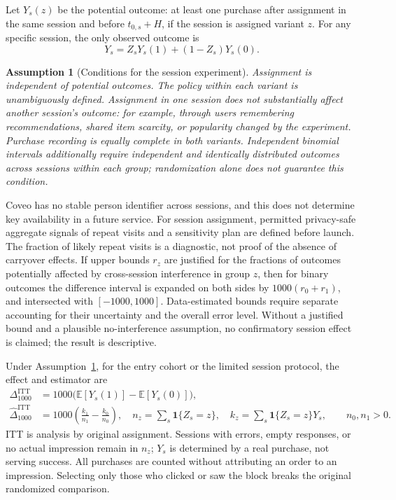 \documentclass[12pt,a4paper]{article}
\newcommand{\E}{\mathbb E}
\newcommand{\ind}{\mathbf 1}
\theoremstyle{plainru}
\newtheorem{assumption}{Assumption}[section]
\begin{document}
Let $Y_s(z)$ be the potential outcome: at least one purchase
after assignment in the same session and before $t_{0,s}+H$, if the session is assigned
variant $z$. For any specific session, the only observed outcome is
\begin{equation}\label{eq:eval-observed-outcome}
 Y_s=Z_sY_s(1)+(1-Z_s)Y_s(0).
\end{equation}
\begin{assumption}[Conditions for the session experiment]
\label{ass:eval-randomization}
Assignment is independent of potential outcomes.
The policy within each variant is unambiguously defined.
Assignment in one session does not substantially affect another session's outcome:
for example, through users remembering recommendations, shared item
scarcity, or popularity changed by the experiment.
Purchase recording is equally complete in both variants.
Independent binomial intervals additionally require
independent and identically distributed outcomes across sessions within
each group; randomization alone does not guarantee this condition.
\end{assumption}

Coveo has no stable person identifier across sessions, and
this does not determine key availability in a future service. For session
assignment, permitted privacy-safe aggregate signals of repeat visits
and a sensitivity plan are defined before launch. The fraction of likely
repeat visits is a diagnostic, not proof of the absence of carryover effects.
If upper bounds $r_z$ are justified for the fractions of outcomes potentially
affected by cross-session interference in group $z$, then for binary outcomes
the difference interval is expanded on both sides by $1000(r_0+r_1)$,
and intersected with $[-1000,1000]$. Data-estimated bounds require separate
accounting for their uncertainty and the overall error level. Without
a justified bound and a plausible no-interference assumption,
no confirmatory session effect is claimed; the result is descriptive.

Under Assumption~\ref{ass:eval-randomization}, for the entry
cohort or the limited session protocol, the effect and estimator are
\begin{align}
 \Delta_{1000}^{\mathrm{ITT}}
 &=1000\bigl(\E[Y_s(1)]-\E[Y_s(0)]\bigr),
 \label{eq:eval-itt-estimand}\\
 \widehat\Delta_{1000}^{\mathrm{ITT}}
 &=1000\left(\frac{k_1}{n_1}-\frac{k_0}{n_0}\right),
 \quad n_z=\sum_s\ind\{Z_s=z\},\quad
 k_z=\sum_s\ind\{Z_s=z\}Y_s,\qquad n_0,n_1>0.
 \label{eq:eval-itt-estimator}
\end{align}
ITT is analysis by original assignment. Sessions with errors,
empty responses, or no actual impression remain in $n_z$; $Y_s$ is determined
by a real purchase, not serving success. All purchases are counted
without attributing an order to an impression. Selecting only those who clicked or saw
the block breaks the original randomized comparison.
\end{document}
